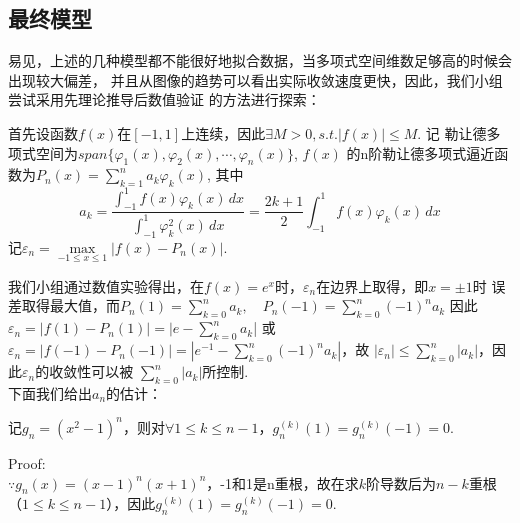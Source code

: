\documentclass{article}
\begin{document}
    \subsection{最终模型}
    易见，上述的几种模型都不能很好地拟合数据，当多项式空间维数足够高的时候会出现较大偏差，
    并且从图像的趋势可以看出实际收敛速度更快，因此，我们小组尝试采用先理论推导后数值验证
    的方法进行探索：
    \par
    首先设函数$f(x)$在$[-1,1]$上连续，因此$\exists M>0, s.t. |f(x)|\leqslant M $. 记
    勒让德多项式空间为$span\{\varphi_1(x),\varphi_2(x),\cdots,\varphi_n(x)\}$, $f(x)$
    的n阶勒让德多项式逼近函数为$P_n(x)=\sum_{k=1}^{n} a_k\varphi_k(x) $, 其中
    $$a_k=\frac{\int_{-1}^{1} f(x)\varphi_k(x)\,dx}{\int_{-1}^{1} \varphi_k^2(x)\,dx}
    =\frac{2k+1}{2}\int_{-1}^{1} f(x)\varphi_k(x)\,dx
    $$
    记$\varepsilon_n=\mathop{max}\limits_{-1\leqslant x\leqslant 1}|f(x)-P_n(x)|$.\\
    \par
    我们小组通过数值实验得出，在$f(x)=e^x$时，$\varepsilon_n$在边界上取得，即$x=\pm 1$时
    误差取得最大值，而$P_n(1)=\sum_{k=0}^{n} a_k,\quad P_n(-1)=\sum_{k=0}^{n} (-1)^n a_k$
    因此$\varepsilon_n=|f(1)-P_n(1)|=|e-\sum_{k=0}^{n} a_k$| 或 
    $ \varepsilon_n=|f(-1)-P_n(-1)|=|e^{-1}-\sum_{k=0}^{n} (-1)^n a_k|$，故
    $|\varepsilon_n|\leqslant \sum_{k=0}^{n} |a_k|$，因此$\varepsilon_n$的收敛性可以被
    $\sum_{k=0}^{n} |a_k|$所控制.\\
    下面我们给出$a_n$的估计：\\
    \begin{lemma}
        记$g_n=(x^2-1)^n$，则对$\forall 1\leqslant k \leqslant n-1$，$g_n^{(k)}(1)=
        g_n^{(k)}(-1)=0$.
    \end{lemma}
    Proof:\\
    $\because g_n(x)=(x-1)^n(x+1)^n$，-1和1是n重根，故在求$k$阶导数后为$n-k$重根
    （$1\leqslant k \leqslant n-1$），因此$g_n^{(k)}(1)=g_n^{(k)}(-1)=0$.\\
\end{document}
